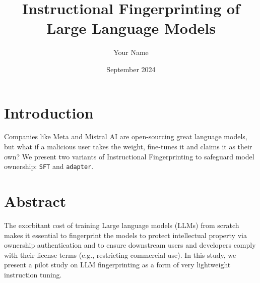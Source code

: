 \documentclass{article}
\title{Instructional Fingerprinting of Large Language Models}
\author{Your Name}
\date{September 2024}
\begin{document}
\maketitle

\section{Introduction}
\label{sec:intro}

Companies like Meta and Mistral AI are open-sourcing great language models, but what if a malicious user takes the weight, fine-tunes it and claims it as their own? We present two variants of Instructional Fingerprinting to safeguard model ownership: \texttt{SFT} and \texttt{adapter}.

\section{Abstract}
\label{sec:abstract}

The exorbitant cost of training Large language models (LLMs) from scratch makes it essential to fingerprint the models to protect intellectual property via ownership authentication and to ensure downstream users and developers comply with their license terms (e.g., restricting commercial use). In this study, we present a pilot study on LLM fingerprinting as a form of very lightweight instruction tuning.
\end{document}

